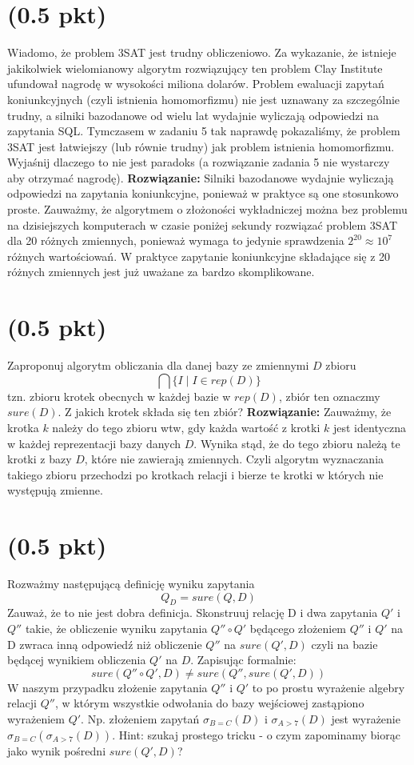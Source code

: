 \documentclass{article}
\begin{document}
\section{(0.5 pkt)}
Wiadomo, że problem 3SAT jest trudny obliczeniowo. Za wykazanie, że istnieje jakikolwiek wielomianowy algorytm rozwiązujący ten problem Clay Institute ufundował nagrodę w wysokości miliona dolarów. Problem ewaluacji zapytań koniunkcyjnych (czyli istnienia homomorfizmu) nie jest uznawany za szczególnie trudny, a silniki bazodanowe od wielu lat wydajnie wyliczają odpowiedzi na zapytania SQL. Tymczasem w zadaniu 5 tak naprawdę pokazaliśmy, że problem 3SAT jest łatwiejszy (lub równie trudny) jak problem istnienia homomorfizmu. Wyjaśnij dlaczego to nie jest paradoks (a rozwiązanie zadania 5 nie wystarczy
aby otrzymać nagrodę).
\newline \textbf{Rozwiązanie:}
Silniki bazodanowe wydajnie wyliczają odpowiedzi na zapytania koniunkcyjne, ponieważ w praktyce są one stosunkowo proste. Zauważmy, że algorytmem o złożoności wykładniczej można bez problemu na dzisiejszych komputerach w czasie poniżej sekundy rozwiązać problem 3SAT dla 20 różnych zmiennych, ponieważ wymaga to jedynie sprawdzenia $2^{20} \approx 10^7$ różnych wartościowań. W praktyce zapytanie koniunkcyjne składające się z 20 różnych zmiennych jest już uważane za bardzo skomplikowane.

\section{(0.5 pkt)}
Zaproponuj algorytm obliczania dla danej bazy ze zmiennymi $D$ zbioru
\[
        \bigcap\{I \mid I \in rep(D)\}
\]
tzn. zbioru krotek obecnych w każdej bazie w $rep(D)$, zbiór ten oznaczmy $sure(D)$.
Z jakich krotek składa się ten zbiór?
\newline \textbf{Rozwiązanie:}
Zauważmy, że krotka $k$ należy do tego zbioru wtw, gdy każda wartość z krotki $k$ jest identyczna w każdej reprezentacji bazy danych $D$. Wynika stąd, że do tego zbioru należą te krotki z bazy $D$, które nie zawierają zmiennych. Czyli algorytm wyznaczania takiego zbioru przechodzi po krotkach relacji i bierze te krotki w których nie występują zmienne.

\section{(0.5 pkt)}
Rozważmy następującą definicję wyniku zapytania
\[
        Q_D = sure(Q, D)
\]
Zauważ, że to nie jest dobra definicja. Skonstruuj relację D i dwa zapytania $Q'$ i $Q''$ takie, że obliczenie wyniku zapytania $Q'' \circ Q'$ będącego złożeniem $Q''$ i $Q'$ na D zwraca inną odpowiedź niż obliczenie $Q''$ na $sure(Q', D)$ czyli na bazie będącej wynikiem obliczenia $Q'$ na $D$. Zapisując formalnie:
\[
        sure(Q'' \circ Q', D) \neq sure(Q'', sure(Q', D))
\]
W naszym przypadku złożenie zapytania $Q''$ i $Q'$ to po prostu wyrażenie algebry relacji $Q''$, w którym wszystkie odwołania do bazy wejściowej zastąpiono wyrażeniem $Q'$. Np. złożeniem zapytań $\sigma_{B=C} (D)$ i $\sigma_{A>7}(D)$ jest wyrażenie $\sigma_{B=C} (\sigma_{A>7}(D))$.
\newline Hint: szukaj prostego tricku - o czym zapominamy biorąc jako wynik pośredni $sure(Q', D)$?
\end{document}
